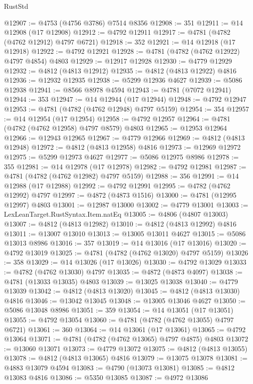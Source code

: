 \begin{lexlean}{RustStd}
\begin{coremodule}
@12907 := @4753 (@4756 @3786) @7514 @8356
@12908 := 351
@12911 := @14 @12908 (@17 @12908)
@12912 := @4792 @12911
@12917 := @4781 (@4782 (@4762 @12912) @4797 @6721)
@12918 := 352
@12921 := @14 @12918 (@17 @12918)
@12922 := @4792 @12921
@12928 := @4781 (@4782 (@4762 @12922) @4797 @4854) @4803
@12929 := @12917 @12928
@12930 := @4779 @12929
@12932 := @4812 (@4813 @12912)
@12935 := @4812 (@4813 @12922) @4816
@12936 := @12932 @12935
@12938 := @5299 @12936 @4627
@12939 := @5086 @12938
@12941 := @8566 @8978 @4594
@12943 := @4781 (@7072 @12941)
@12944 := 353
@12947 := @14 @12944 (@17 @12944)
@12948 := @4792 @12947
@12953 := @4781 (@4782 (@4762 @12948) @4797 @5159)
@12954 := 354
@12957 := @14 @12954 (@17 @12954)
@12958 := @4792 @12957
@12964 := @4781 (@4782 (@4762 @12958) @4797 @8579) @4803
@12965 := @12953 @12964
@12966 := @12943 @12965
@12967 := @4779 @12966
@12969 := @4812 (@4813 @12948)
@12972 := @4812 (@4813 @12958) @4816
@12973 := @12969 @12972
@12975 := @5299 @12973 @4627
@12977 := @5086 @12975 @8986
@12978 := 355
@12981 := @14 @12978 (@17 @12978)
@12982 := @4792 @12981
@12987 := @4781 (@4782 (@4762 @12982) @4797 @5159)
@12988 := 356
@12991 := @14 @12988 (@17 @12988)
@12992 := @4792 @12991
@12995 := @4782 (@4762 @12992) @4797
@12997 := @4872 (@4873 @1516)
@13000 := @4781 (@12995 @12997) @4803
@13001 := @12987 @13000
@13002 := @4779 @13001
@13003 := LexLeanTarget.RustSyntax.Item.natEq
@13005 := @4806 (@4807 @13003)
@13007 := @4812 (@4813 @12982)
@13010 := @4812 (@4813 @12992) @4816
@13011 := @13007 @13010
@13013 := @13005 @13011 @4627
@13015 := @5086 @13013 @8986
@13016 := 357
@13019 := @14 @13016 (@17 @13016)
@13020 := @4792 @13019
@13025 := @4781 (@4782 (@4762 @13020) @4797 @5159)
@13026 := 358
@13029 := @14 @13026 (@17 @13026)
@13030 := @4792 @13029
@13033 := @4782 (@4762 @13030) @4797
@13035 := @4872 (@4873 @4097)
@13038 := @4781 (@13033 @13035) @4803
@13039 := @13025 @13038
@13040 := @4779 @13039
@13042 := @4812 (@4813 @13020)
@13045 := @4812 (@4813 @13030) @4816
@13046 := @13042 @13045
@13048 := @13005 @13046 @4627
@13050 := @5086 @13048 @8986
@13051 := 359
@13054 := @14 @13051 (@17 @13051)
@13055 := @4792 @13054
@13060 := @4781 (@4782 (@4762 @13055) @4797 @6721)
@13061 := 360
@13064 := @14 @13061 (@17 @13061)
@13065 := @4792 @13064
@13071 := @4781 (@4782 (@4762 @13065) @4797 @4875) @4803
@13072 := @13060 @13071
@13073 := @4779 @13072
@13075 := @4812 (@4813 @13055)
@13078 := @4812 (@4813 @13065) @4816
@13079 := @13075 @13078
@13081 := @4883 @13079 @4594
@13083 := @4790 (@13073 @13081)
@13085 := @4812 @13083 @4816
@13086 := @5350 @13085
@13087 := @4972 @13086

\end{coremodule}
\end{lexlean}
